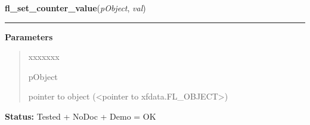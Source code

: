     \label{xformslib:library:fl_set_counter_value}

    \vspace{0.5ex}

\hspace{.8\funcindent}\begin{boxedminipage}{\funcwidth}

    \raggedright \textbf{fl\_set\_counter\_value}(\textit{pObject}, \textit{val})

    \vspace{-1.5ex}

    \rule{\textwidth}{0.5\fboxrule}
\setlength{\parskip}{2ex}
\setlength{\parskip}{1ex}
      \textbf{Parameters}
      \vspace{-1ex}

      \begin{quote}
        \begin{Ventry}{xxxxxxx}

          \item[pObject]

          pointer to object ({\textless}pointer to 
          xfdata.FL\_OBJECT{\textgreater})

        \end{Ventry}

      \end{quote}

\textbf{Status:} Tested + NoDoc + Demo = OK



    \end{boxedminipage}

    \label{xformslib:library:fl_set_counter_bounds}

    \vspace{0.5ex}


